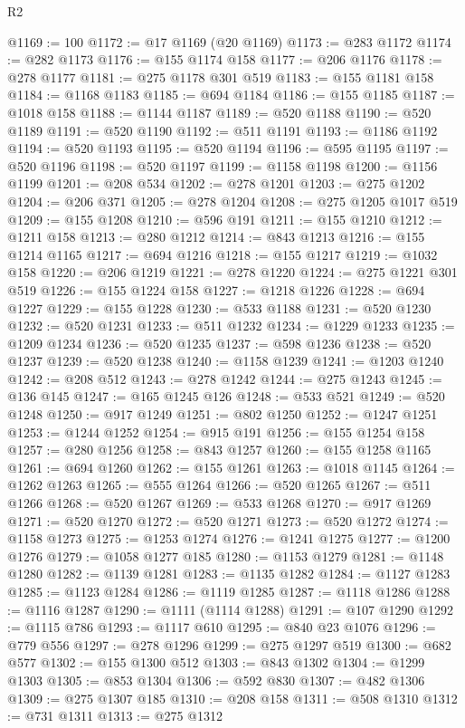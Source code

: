 \begin{lexlean}{R2}
\begin{coremodule}
@1169 := 100
@1172 := @17 @1169 (@20 @1169)
@1173 := @283 @1172
@1174 := @282 @1173
@1176 := @155 @1174 @158
@1177 := @206 @1176
@1178 := @278 @1177
@1181 := @275 @1178 @301 @519
@1183 := @155 @1181 @158
@1184 := @1168 @1183
@1185 := @694 @1184
@1186 := @155 @1185
@1187 := @1018 @158
@1188 := @1144 @1187
@1189 := @520 @1188
@1190 := @520 @1189
@1191 := @520 @1190
@1192 := @511 @1191
@1193 := @1186 @1192
@1194 := @520 @1193
@1195 := @520 @1194
@1196 := @595 @1195
@1197 := @520 @1196
@1198 := @520 @1197
@1199 := @1158 @1198
@1200 := @1156 @1199
@1201 := @208 @534
@1202 := @278 @1201
@1203 := @275 @1202
@1204 := @206 @371
@1205 := @278 @1204
@1208 := @275 @1205 @1017 @519
@1209 := @155 @1208
@1210 := @596 @191
@1211 := @155 @1210
@1212 := @1211 @158
@1213 := @280 @1212
@1214 := @843 @1213
@1216 := @155 @1214 @1165
@1217 := @694 @1216
@1218 := @155 @1217
@1219 := @1032 @158
@1220 := @206 @1219
@1221 := @278 @1220
@1224 := @275 @1221 @301 @519
@1226 := @155 @1224 @158
@1227 := @1218 @1226
@1228 := @694 @1227
@1229 := @155 @1228
@1230 := @533 @1188
@1231 := @520 @1230
@1232 := @520 @1231
@1233 := @511 @1232
@1234 := @1229 @1233
@1235 := @1209 @1234
@1236 := @520 @1235
@1237 := @598 @1236
@1238 := @520 @1237
@1239 := @520 @1238
@1240 := @1158 @1239
@1241 := @1203 @1240
@1242 := @208 @512
@1243 := @278 @1242
@1244 := @275 @1243
@1245 := @136 @145
@1247 := @165 @1245 @126
@1248 := @533 @521
@1249 := @520 @1248
@1250 := @917 @1249
@1251 := @802 @1250
@1252 := @1247 @1251
@1253 := @1244 @1252
@1254 := @915 @191
@1256 := @155 @1254 @158
@1257 := @280 @1256
@1258 := @843 @1257
@1260 := @155 @1258 @1165
@1261 := @694 @1260
@1262 := @155 @1261
@1263 := @1018 @1145
@1264 := @1262 @1263
@1265 := @555 @1264
@1266 := @520 @1265
@1267 := @511 @1266
@1268 := @520 @1267
@1269 := @533 @1268
@1270 := @917 @1269
@1271 := @520 @1270
@1272 := @520 @1271
@1273 := @520 @1272
@1274 := @1158 @1273
@1275 := @1253 @1274
@1276 := @1241 @1275
@1277 := @1200 @1276
@1279 := @1058 @1277 @185
@1280 := @1153 @1279
@1281 := @1148 @1280
@1282 := @1139 @1281
@1283 := @1135 @1282
@1284 := @1127 @1283
@1285 := @1123 @1284
@1286 := @1119 @1285
@1287 := @1118 @1286
@1288 := @1116 @1287
@1290 := @1111 (@1114 @1288)
@1291 := @107 @1290
@1292 := @1115 @786
@1293 := @1117 @610
@1295 := @840 @23 @1076
@1296 := @779 @556
@1297 := @278 @1296
@1299 := @275 @1297 @519
@1300 := @682 @577
@1302 := @155 @1300 @512
@1303 := @843 @1302
@1304 := @1299 @1303
@1305 := @853 @1304
@1306 := @592 @830
@1307 := @482 @1306
@1309 := @275 @1307 @185
@1310 := @208 @158
@1311 := @508 @1310
@1312 := @731 @1311
@1313 := @275 @1312

\end{coremodule}
\end{lexlean}
